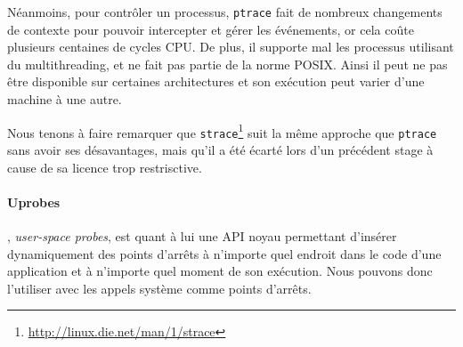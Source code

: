 Néanmoins, pour contrôler un processus, \texttt{ptrace} fait de nombreux
changements de contexte pour pouvoir intercepter et gérer les événements, or
cela coûte plusieurs centaines de cycles CPU. De plus, il supporte mal
les processus utilisant du multithreading, et ne fait pas partie de la norme
POSIX. Ainsi il peut ne pas être disponible sur certaines architectures et son
exécution peut varier d'une machine à une autre.

Nous tenons à faire remarquer que \texttt{strace}\footnote{\url{http://linux.die.net/man/1/strace}} suit la même approche que \texttt{ptrace} sans avoir ses désavantages, mais qu'il a été écarté lors d'un précédent stage à cause de sa licence trop restrisctive.

\paragraph{Uprobes}\citep{AS:Interception, MARION:Interception},
\textit{user-space probes}, est quant à lui une API noyau permettant d'insérer
dynamiquement des points d'arrêts à n'importe quel endroit dans le code d'une
application et à n'importe quel moment de son exécution. Nous pouvons donc
l'utiliser avec les appels système comme points d'arrêts.

